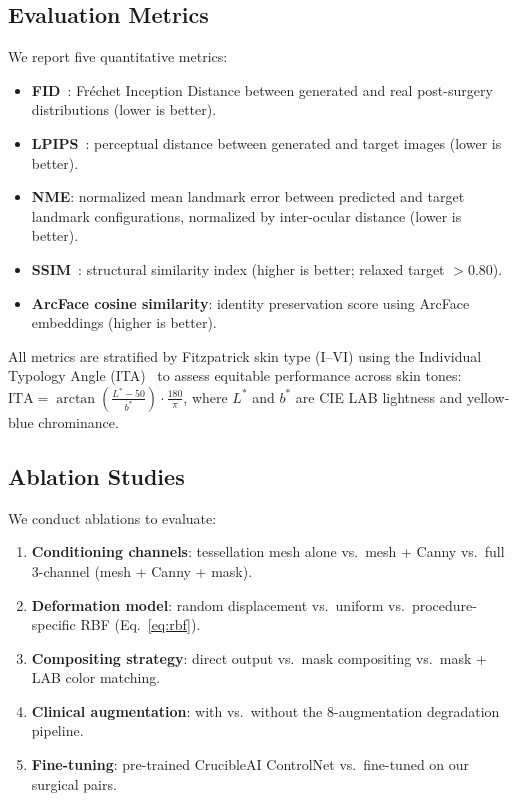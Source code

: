 \documentclass[runningheads]{llncs}
\begin{document}
\subsection{Evaluation Metrics}

We report five quantitative metrics:

\begin{itemize}
    \item \textbf{FID}~\cite{heusel2017fid}: Fr\'echet Inception Distance
    between generated and real post-surgery distributions (lower is better).
    \item \textbf{LPIPS}~\cite{zhang2018lpips}: perceptual distance
    between generated and target images (lower is better).
    \item \textbf{NME}: normalized mean landmark error between predicted
    and target landmark configurations, normalized by inter-ocular
    distance (lower is better).
    \item \textbf{SSIM}~\cite{wang2004ssim}: structural similarity index
    (higher is better; relaxed target $>0.80$).
    \item \textbf{ArcFace cosine similarity}: identity preservation score
    using ArcFace~\cite{deng2019arcface} embeddings (higher is better).
\end{itemize}

All metrics are stratified by Fitzpatrick skin type (I--VI) using the
Individual Typology Angle (ITA)~\cite{chardon1991ita} to assess equitable
performance across skin tones:
$\text{ITA} = \arctan\!\left(\frac{L^* - 50}{b^*}\right) \cdot
\frac{180}{\pi}$, where $L^*$ and $b^*$ are CIE LAB lightness and
yellow-blue chrominance.

\subsection{Ablation Studies}

We conduct ablations to evaluate:
\begin{enumerate}
    \item \textbf{Conditioning channels}: tessellation mesh alone vs.\
    mesh + Canny vs.\ full 3-channel (mesh + Canny + mask).
    \item \textbf{Deformation model}: random displacement vs.\ uniform
    vs.\ procedure-specific RBF (Eq.~\ref{eq:rbf}).
    \item \textbf{Compositing strategy}: direct output vs.\ mask
    compositing vs.\ mask + LAB color matching.
    \item \textbf{Clinical augmentation}: with vs.\ without the
    8-augmentation degradation pipeline.
    \item \textbf{Fine-tuning}: pre-trained CrucibleAI ControlNet vs.\
    fine-tuned on our surgical pairs.
\end{enumerate}
\end{document}
